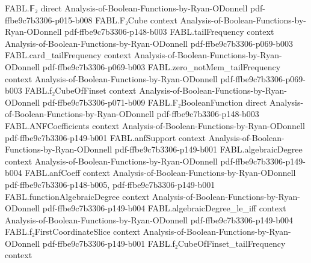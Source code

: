 \begin{theorem}
\label{FABL.firstCoordinateSlice_zero_degree_le_pred_of_one_slice_zero}
\leanok
{}
\proofstep
  {FABL.𝔽₂}
  {direct}
  {Analysis-of-Boolean-Functions-by-Ryan-ODonnell}
  {pdf-ffbe9c7b3306-p015-b008}
\proofstep
  {FABL.F₂Cube}
  {context}
  {Analysis-of-Boolean-Functions-by-Ryan-ODonnell}
  {pdf-ffbe9c7b3306-p148-b003}
\proofstep
  {FABL.tailFrequency}
  {context}
  {Analysis-of-Boolean-Functions-by-Ryan-ODonnell}
  {pdf-ffbe9c7b3306-p069-b003}
\proofstep
  {FABL.card_tailFrequency}
  {context}
  {Analysis-of-Boolean-Functions-by-Ryan-ODonnell}
  {pdf-ffbe9c7b3306-p069-b003}
\proofstep
  {FABL.zero_notMem_tailFrequency}
  {context}
  {Analysis-of-Boolean-Functions-by-Ryan-ODonnell}
  {pdf-ffbe9c7b3306-p069-b003}
\proofstep
  {FABL.f₂CubeOfFinset}
  {context}
  {Analysis-of-Boolean-Functions-by-Ryan-ODonnell}
  {pdf-ffbe9c7b3306-p071-b009}
\proofstep
  {FABL.F₂BooleanFunction}
  {direct}
  {Analysis-of-Boolean-Functions-by-Ryan-ODonnell}
  {pdf-ffbe9c7b3306-p148-b003}
\proofstep
  {FABL.ANFCoefficients}
  {context}
  {Analysis-of-Boolean-Functions-by-Ryan-ODonnell}
  {pdf-ffbe9c7b3306-p149-b001}
\proofstep
  {FABL.anfSupport}
  {context}
  {Analysis-of-Boolean-Functions-by-Ryan-ODonnell}
  {pdf-ffbe9c7b3306-p149-b001}
\proofstep
  {FABL.algebraicDegree}
  {context}
  {Analysis-of-Boolean-Functions-by-Ryan-ODonnell}
  {pdf-ffbe9c7b3306-p149-b004}
\proofstep
  {FABL.anfCoeff}
  {context}
  {Analysis-of-Boolean-Functions-by-Ryan-ODonnell}
  {pdf-ffbe9c7b3306-p148-b005,
    pdf-ffbe9c7b3306-p149-b001}
\proofstep
  {FABL.functionAlgebraicDegree}
  {context}
  {Analysis-of-Boolean-Functions-by-Ryan-ODonnell}
  {pdf-ffbe9c7b3306-p149-b004}
\proofstep
  {FABL.algebraicDegree_le_iff}
  {context}
  {Analysis-of-Boolean-Functions-by-Ryan-ODonnell}
  {pdf-ffbe9c7b3306-p149-b004}
\proofstep
  {FABL.f₂FirstCoordinateSlice}
  {context}
  {Analysis-of-Boolean-Functions-by-Ryan-ODonnell}
  {pdf-ffbe9c7b3306-p149-b001}
\proofstep
  {FABL.f₂CubeOfFinset_tailFrequency}
  {context}

\end{theorem}
